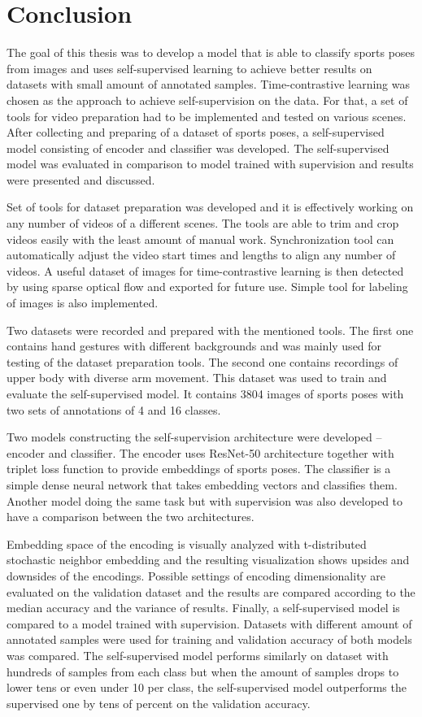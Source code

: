 \chapter{\label{chap:conclusion}Conclusion}

The goal of this thesis was to develop a model that is able to classify sports poses from images and uses self-supervised learning to achieve better results on datasets with small amount of annotated samples. Time-contrastive learning was chosen as the approach to achieve self-supervision on the data. For that, a set of tools for video preparation had to be implemented and tested on various scenes. After collecting and preparing of a dataset of sports poses, a self-supervised model consisting of encoder and classifier was developed. The self-supervised model was evaluated in comparison to model trained with supervision and results were presented and discussed. 

Set of tools for dataset preparation was developed and it is effectively working on any number of videos of a different scenes. The tools are able to trim and crop videos easily with the least amount of manual work. Synchronization tool can automatically adjust the video start times and lengths to align any number of videos. A useful dataset of images for time-contrastive learning is then detected by using sparse optical flow and exported for future use. Simple tool for labeling of images is also implemented.

Two datasets were recorded and prepared with the mentioned tools. The first one contains hand gestures with different backgrounds and was mainly used for testing of the dataset preparation tools. The second one contains recordings of upper body with diverse arm movement. This dataset was used to train and evaluate the self-supervised model. It contains 3804 images of sports poses with two sets of annotations of 4 and 16 classes.

Two models constructing the self-supervision architecture were developed -- encoder and classifier. The encoder uses ResNet-50 architecture together with triplet loss function to provide embeddings of sports poses. The classifier is a simple dense neural network that takes embedding vectors and classifies them. Another model doing the same task but with supervision was also developed to have a comparison between the two architectures.

Embedding space of the encoding is visually analyzed with t-distributed stochastic neighbor embedding and the resulting visualization shows upsides and downsides of the encodings. Possible settings of encoding dimensionality are evaluated on the validation dataset and the results are compared according to the median accuracy and the variance of results. Finally, a self-supervised model is compared to a model trained with supervision. Datasets with different amount of annotated samples were used for training and validation accuracy of both models was compared. The self-supervised model performs similarly on dataset with hundreds of samples from each class but when the amount of samples drops to lower tens or even under 10 per class, the self-supervised model outperforms the supervised one by tens of percent on the validation accuracy.

